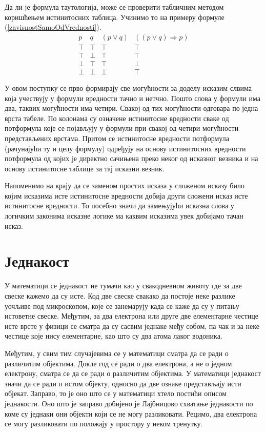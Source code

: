 \documentclass[a4paper]{book}
\begin{document}
Да ли је формула таутологија, може се проверити табличним методом коришћењем истинитосних таблица.
Учинимо то на примеру формуле (\ref{zavisnostSamoOdVrednosti}).
$$
\begin{array}{c|c|c|c}
p & q & (p\lor q) & ((p\lor q)\Rightarrow p)
\\
\hline
\top & \top & \top & \top
\\
\top & \bot & \top & \top
\\
\bot & \top & \top & \bot
\\
\bot & \bot & \bot & \top
\end{array}
$$

У овом поступку се прво формирају све могућности за доделу исказим слвима која учествују у формули
вредности тачно и нетчно. Пошто слова у формули има два, таквих могућности има четири.
Свакој од тих могућности одговара по једна врста табеле. По колонама су означене истинитосне вредности
сваке од потформула које се појављују у формули при свакој од четири могућности представљених врстама.
Притом се истинитосне вредности потформула (рачунајући ту и целу формулу) одређују на основу
истинитосних вредности потформула од којих је директно сачињена преко неког од исказног везника
и на основу истинитосне таблице за тај исказни везник.

Напоменимо на крају да се заменом простих исказа у сложеном исказу било којим исказима исте исти\-ни\-то\-сне вредности
добија други сложени исказ исте истинитосне вре\-дно\-сти. То посебно значи да замењујући исказна слова
у логичким законима исказне логике ма каквим исказима увек добијамо тачан исказ.

\section{Једнакост}

\indent

У математици се једнакост не тумачи као у свакодневном животу где за две свеске кажемо да су исте.
Код две свеске свакако да постоје неке разлике уочљиве под ми\-кро\-ско\-пом, које се занемарују када се
каже да су у питању истоветне свеске. Међутим, за два електрона или друге две елементарне честице
исте врсте у физици се сматра да су сасвим једнаке међу собом, па чак и за неке честице које нису
елементарне, као што су два атома лаког водоника.

Међутим, у свим тим случајевима се у математици сматра да се ради о различитим објектима. Докле год се ради
о два електрона, а не о једном електрону, сматра се да се ради о различитим објектима.
У математици једнакост значи да се ради о истом објекту, односно да две ознаке представљају исти објекат.
Заправо, то је оно што се у математици хтело постићи описом једнакости. Оно што је заправо добијено
је Лајбницово схватање једнакости по коме су једнаки они објекти који се не могу разликовати.
Рецимо, два електрона се могу разликовати по положају у простору у неком тренутку.
\end{document}
